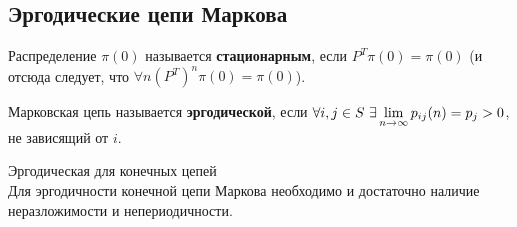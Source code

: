 \newpage
{}
\subsection{Эргодические цепи Маркова}
\begin{Def}
    Распределение $\pi(0)$ называется \textbf{стационарным}, если $P^T\pi(0) =
    \pi(0)$ (и отсюда следует, что $\forall n \left( P^T \right)^n \pi(0) =
    \pi(0)$).
\end{Def}
\begin{Def}
    Марковская цепь называется \textbf{эргодической}, если $\forall i,j \in S \
    \exists \displaystyle \lim_{n\to \infty}p_{ij}(n) = p_j > 0$, не зависящий от $i$.
\end{Def}
\begin{theorem} Эргодическая для конечных цепей
    \\
    Для эргодичности конечной цепи Маркова необходимо и достаточно наличие
    неразложимости и непериодичности.
\end{theorem}
